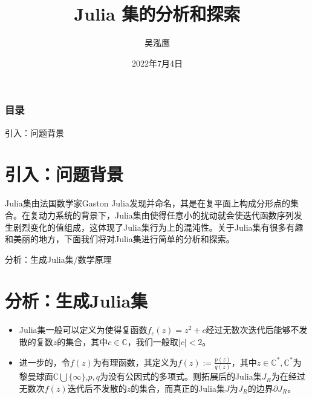 \documentclass{beamer}
\title[Beamer + xelatex] %
{\Huge Julia 集的分析和探索}
\author[Wu HY] %
{吴泓鹰}
\institute[ZJU] %
{
	数学与应用数学(强基计划)\\
	3210101890
}
\date[] %
{2022年7月4日}
\begin{document}
	
\begin{frame}
	\titlepage %
\end{frame}

\begin{frame}
	\frametitle{目录}
	\tableofcontents
\end{frame}

\begin{frame}{引入：问题背景}
\section{引入：问题背景}
Julia集由法国数学家Gaston Julia发现并命名，其是在复平面上构成分形点的集合。在复动力系统的背景下，Julia集由使得任意小的扰动就会使迭代函数序列发生剧烈变化的值组成，这体现了Julia集行为上的混沌性。关于Julia集有很多有趣和美丽的地方，下面我们将对Julia集进行简单的分析和探索。
\end{frame}

\begin{frame}{分析：生成Julia集/数学原理}
\section{分析：生成Julia集}
\begin{itemize}
\item Julia集一般可以定义为使得复函数$f_c(z)=z^2+c$经过无数次迭代后能够不发散的复数$z$的集合，其中$c\in\mathbb{C}$，我们一般取$|c|<2$。
\item 进一步的，令$f(z)$为有理函数，其定义为$\displaystyle f(z):=\frac{p(z)}{q(z)}$，其中$z\in\mathbb{C}^*,\mathbb{C}^*$为黎曼球面$\mathbb{C}\bigcup\{\infty\}$,$p,q$为没有公因式的多项式。则拓展后的Julia集$J_R$为在经过无数次$f(z)$迭代后不发散的$z$的集合，而真正的Julia集$J$为$J_R$的边界$\partial J_R$。
\end{itemize}
\end{frame}
\end{document}
